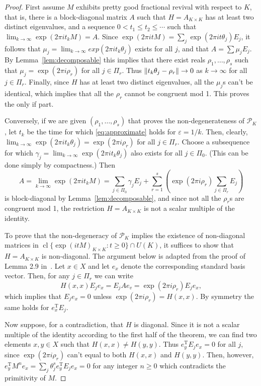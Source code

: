 \documentclass[11pt]{article}
\theoremstyle{definition}
\numberwithin{equation}{section}
\newcommand{\PK}[1][K]{\mathcal{P}_{#1}}
\newcommand\+{\mkern2mu}
\newcommand{\ep}{\varepsilon}
\newcommand{\1}{\mathbf 1}
\newcommand{\tr}{\mathrm{T}}
\DeclareMathOperator{\cl}{cl}
\DeclarePairedDelimiter{\znorm}{\lVert}{\rVert}
\begin{document}
\begin{proof}
First assume $M$ exhibits pretty good fractional revival with respect to $K$, that is, there is a block-diagonal matrix $A$ such that $H  = A_{K\times K}$ has at least two distinct eigenvalues, and a sequence $0 < t_1 \leq t_2 \leq \cdots$ such that $\lim_{k\to \infty} \exp(2\pi i t_k M) = A$. Since $\exp(2\pi i t M) = \sum_j \exp(2\pi i t \theta_j) E_j$, it follows that $\mu_j = \lim_{k\to \infty} exp(2\pi i t_k \theta_j)$ exists for all $j$, and that $A = \sum \mu_j E_j$. By Lemma~\ref{lem:decomposable} this implies that there exist reals $\rho_1, \dots, \rho_s$ such that $\mu_j = \exp(2\pi i \rho_r)$ for all $j \in \Pi_r$. Thus $\znorm{t_k \theta_j - \rho_r} \to 0$ as $k\to \infty$ for all $j \in \Pi_r$. Finally, since $H$ has at least two distinct eigenvalues, all the $\mu_j$s can't be identical, which implies that all the $\rho_r$ cannot be congruent mod 1. This proves the only if part.

Conversely, if we are given $(\rho_1,\dots, \rho_s)$ that proves the non-degenerateness of $\PK$, let $t_k$ be the time for which \eqref{eq:approximate} holds for $\ep = 1/k$. Then, clearly, $\lim_{k\to \infty} \exp(2\pi i t_k \theta_j) = \exp(2\pi i \rho_r)$ for all $j \in \Pi_r$. Choose a subsequence for which $\gamma_j = \lim_{k \to \infty} \exp(2\pi i t_k \theta_j)$ also exists for all $j \in \Pi_0$. (This can be done simply by compactness.) Then 
\begin{equation}\label{eq:closure} 
A =  \lim_{k\to \infty} \exp(2\pi i t_k M) = \sum_{j \in \Pi_0} \gamma_j E_j + \sum_{r=1}^s \left(\exp(2\pi i \rho_r) \sum_{j \in \Pi_r} E_j\right)
\end{equation} 
is block-diagonal by Lemma~\ref{lem:decomposable}, and since not all the $\rho_r$s are congruent mod 1, the restriction $H = A_{K\times K}$ is not a scalar multiple of the identity.

To prove that the non-degeneracy of $\PK$ implies the existence of non-diagonal matrices in $\cl \{ \exp(i t M)_{K \times K} : t \geq 0\} \cap U(K)$, it suffices to show that $H = A_{K\times K}$ is non-diagonal. The argument below is adapted from the proof of Lemma 2.9 in~\cite{chan2020fundamentals}. Let $x \in X$ and let $e_x$ denote the corresponding standard basis vector. Then, for any $j \in \Pi_r$ we can write
\[ H(x,x) E_j e_x = E_j A e_v = \exp(2\pi i \rho_r) E_j e_x,\] which implies that $E_j e_x = 0$ unless $\exp(2\pi i \rho_r) = H(x,x)$. By symmetry the same holds for $e_x^{\tr} E_j$.  

Now suppose, for a contradiction, that $H$ is diagonal. Since it is not a scalar multiple of the identity according to the first half of the theorem, we can find two elements $x,y \in X$ such that $H(x,x) \neq H(y,y)$. Thus $e_y^{\tr} E_j e_x = 0$ for all $j$, since $\exp(2\pi i \rho_r)$ can't equal to both $H(x,x)$ and $H(y,y)$. Then, however, $e_y^{\tr} M^n e_x = \sum_j \theta_j^s e_y^{\tr} E_j e_x = 0$ for any integer $n\geq 0$ which contradicts the primitivity of $M$. 
\end{proof}
\end{document}
